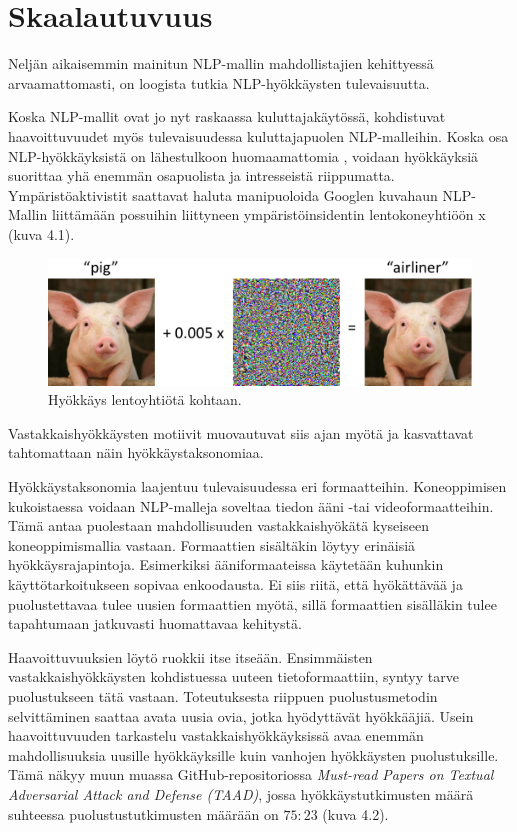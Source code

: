 \chapter{Skaalautuvuus\label{discussion}}
Neljän aikaisemmin mainitun NLP-mallin mahdollistajien kehittyessä arvaamattomasti, on loogista tutkia NLP-hyökkäysten tulevaisuutta. 

Koska NLP-mallit ovat jo nyt raskaassa kuluttajakäytössä, kohdistuvat haavoittuvuudet myös tulevaisuudessa kuluttajapuolen NLP-malleihin. Koska osa NLP-hyökkäyksistä on lähestulkoon huomaamattomia \citep{triggerless}, voidaan hyökkäyksiä suorittaa yhä enemmän osapuolista ja intresseistä riippumatta. Ympäristöaktivistit saattavat haluta manipuoloida Googlen kuvahaun NLP-Mallin liittämään possuihin liittyneen ympäristöinsidentin lentokoneyhtiöön x (kuva 4.1).
\begin{figure}[ht]
  \includegraphics[scale=0.4]{figures/piggie.png}
  \caption{Hyökkäys lentoyhtiötä kohtaan. \citep{adversexamples}}
\end{figure}

Vastakkaishyökkäysten motiivit muovautuvat siis ajan myötä ja kasvattavat tahtomattaan näin hyökkäystaksonomiaa. 

Hyökkäystaksonomia laajentuu tulevaisuudessa eri formaatteihin. Koneoppimisen kukoistaessa voidaan NLP-malleja soveltaa tiedon ääni -tai videoformaatteihin. Tämä antaa puolestaan mahdollisuuden vastakkaishyökätä kyseiseen koneoppimismallia vastaan. Formaattien sisältäkin löytyy erinäisiä hyökkäysrajapintoja. Esimerkiksi ääniformaateissa käytetään kuhunkin käyttötarkoitukseen sopivaa enkoodausta. Ei siis riitä, että hyökättävää ja puolustettavaa tulee uusien formaattien myötä, sillä formaattien sisälläkin tulee tapahtumaan jatkuvasti huomattavaa kehitystä.

Haavoittuvuuksien löytö ruokkii itse itseään. Ensimmäisten vastakkaishyökkäysten kohdistuessa uuteen tietoformaattiin, syntyy tarve puolustukseen tätä vastaan. Toteutuksesta riippuen puolustusmetodin selvittäminen saattaa avata uusia ovia, jotka hyödyttävät hyökkääjiä. Usein haavoittuvuuden tarkastelu vastakkaishyökkäyksissä avaa enemmän mahdollisuuksia uusille hyökkäyksille kuin vanhojen hyökkäysten puolustuksille. Tämä näkyy muun muassa GitHub-repositoriossa \textit{Must-read Papers on Textual Adversarial Attack and Defense (TAAD)}, jossa hyökkäystutkimusten määrä suhteessa puolustustutkimusten määrään on $75:23$ (kuva 4.2).

